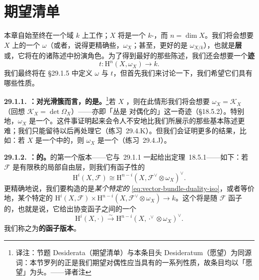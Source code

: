 
\section{期望清单}

本章自始至终在一个域 $k$ 上工作；$X$ 将是一个\trProjective{} $k$-\trScheme，而 $n=\dim X$。我们将会想要 $X$ 上的一个\trCoherentSheaf{} $\boxed{\omega}$（或者，说得更精确些，$\boxed{\omega_X}$；甚至，更好的是 $\omega_{X/k}$），也就是\textbf{\trCanonical{}层}或\textbf{\trDualizingSheaf}，它将在\trDuality{}的诸陈述中扮演角色。为了得到最好的那些陈述，我们还会想要一个\textbf{迹\trMorphism}
\begin{equation*}\tag{29.1.0.1}\label{eq:trace-morphism-hoped}
\boxed{t\colon\mathrm{H}^n(X,\omega_X)\longrightarrow k.}
\end{equation*}
我们最终将在 \S29.1.5 中定义 $\omega$ 与 $t$，但首先我们来讨论一下，我们希望它们具有哪些性质。

\textbf{29.1.1. \trDesideratum{}：对光滑簇而言，\trCotangentBundle{}的\trDeterminant{}是\trDualizingSheaf。}\footnote{译注：节题 Desiderata（期望清单）与本条目头 Desideratum（愿望）为同源词：本节罗列的正是我们期望对偶性应当具有的一系列性质，故条目均以「愿望」为头。——译者注}\quad 若 $X$ \trSmooth，则在此情形我们将会想要 $\boxed{\omega_X=\mathscr{K}_X}$（回想 $\mathscr{K}_X=\det\Omega_X$）——亦即「\trCanonical{}丛是 \trSerre{}对偶化的」这一奇迹（\S18.5.2）。特别地，$\omega_X$ 是一个\trInvertibleSheaf。这件事证明起来会令人不安地比我们所展示的那些基本\trDuality{}陈述更难；我们只能留待以后再处理它（\mbox{练习~29.4.K}）。但我们会证明更多的结果，比如：若 $X$ 是一个\trSmooth\trVariety{}中的\trRegularEmbedding，则 $\omega_X$ 是一个\trInvertibleSheaf（\mbox{练习~29.4.J}）。

\textbf{29.1.2. \trDesideratum{}：\trVectorBundle{}的\trSerreDuality。}\quad \trDuality{}的第一个版本——它与\mbox{\trDesideratum{}~29.1.1} 一起给出\mbox{定理~18.5.1}——如下：若 $\mathscr{F}$ 是有限秩的局部自由层，则我们有函子性的\trIsomorphism
\begin{equation*}\tag{29.1.2.1}\label{eq:vector-bundle-duality-iso}
\mathrm{H}^i(X,\mathscr{F})\cong\mathrm{H}^{n-i}(X,\mathscr{F}^{\vee}\otimes\omega_X)^{\vee}.
\end{equation*}
更精确地说，我们要构造的是\emph{某个特定的}\trIsomorphism{} \eqref{eq:vector-bundle-duality-iso}，或者等价地，某个特定的\trPerfectPairing{} $\mathrm{H}^i(X,\mathscr{F})\times\mathrm{H}^{n-i}(X,\mathscr{F}^{\vee}\otimes\omega_X)\to k$。这个\trIsomorphism{}将是随 $\mathscr{F}$ 函子的，也就是说，它给出协变函子之间的一个\trNaturalIsomorphism
\begin{equation*}\tag{29.1.2.2}\label{eq:vector-bundle-functorial-iso}
\boxed{\mathrm{H}^i(X,\cdot)\overset{\sim}{\longrightarrow}\mathrm{H}^{n-i}(X,\cdot^{\vee}\otimes\omega_X)^{\vee}.}
\end{equation*}
我们称之为\textbf{\trVectorBundle{}的函子版本\trSerreDuality}。

